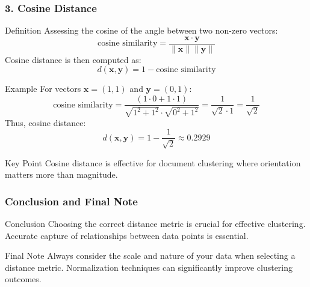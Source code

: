 \documentclass[aspectratio=169]{beamer}
\begin{document}
\begin{frame}[fragile]
    \frametitle{3. Cosine Distance}
    
    \begin{block}{Definition}
        Assessing the cosine of the angle between two non-zero vectors:
        \begin{equation}
        \text{cosine similarity} = \frac{\mathbf{x} \cdot \mathbf{y}}{\|\mathbf{x}\| \|\mathbf{y}\|}
        \end{equation}
        Cosine distance is then computed as:
        \begin{equation}
        d(\mathbf{x}, \mathbf{y}) = 1 - \text{cosine similarity}
        \end{equation}
    \end{block}
    
    \begin{block}{Example}
        For vectors \(\mathbf{x} = (1, 1)\) and \(\mathbf{y} = (0, 1)\):
        \begin{equation}
        \text{cosine similarity} = \frac{(1 \cdot 0 + 1 \cdot 1)}{\sqrt{1^2 + 1^2} \cdot \sqrt{0^2 + 1^2}} = \frac{1}{\sqrt{2} \cdot 1} = \frac{1}{\sqrt{2}}
        \end{equation}
        Thus, cosine distance:
        \begin{equation}
        d(\mathbf{x}, \mathbf{y}) = 1 - \frac{1}{\sqrt{2}} \approx 0.2929
        \end{equation}
    \end{block}
    
    \begin{block}{Key Point}
        Cosine distance is effective for document clustering where orientation matters more than magnitude.
    \end{block}
\end{frame}

\begin{frame}[fragile]
    \frametitle{Conclusion and Final Note}
    
    \begin{block}{Conclusion}
        Choosing the correct distance metric is crucial for effective clustering. Accurate capture of relationships between data points is essential. 
    \end{block}
    
    \begin{block}{Final Note}
        Always consider the scale and nature of your data when selecting a distance metric. Normalization techniques can significantly improve clustering outcomes.
    \end{block}
\end{frame}
\end{document}
